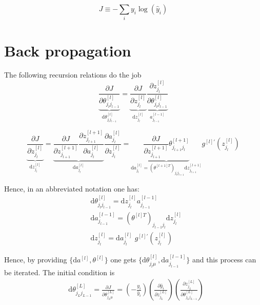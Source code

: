 \documentclass[a4paper,11pt]{article}
\newcommand{\dd}{\text{d}}
\newcommand{\na}[2]{a_{#1}^{[#2]}}
\newcommand{\nz}[2]{z_{#1}^{[#2]}}
\newcommand{\nt}[3]{\theta_{#1 #2}^{[#3]}}
\newcommand{\ff}[2]{#1 \left(#2 \right)}
\begin{document}
\begin{equation}
    J\equiv -\sum_i y_i \ff{\log}{\hat{y}_i }  
\end{equation}

\section{Back propagation}

The following recursion relations do the job
\begin{equation}
    \underbrace{
    \frac{\partial J }{\partial  \nt{j_l}{j_{l-1}}{l}  }
    }_{\dd  \nt{j_l}{j_{l-1}}{l} } 
   =
   \underbrace{
    \frac{\partial J  }{\partial \nz{j_l}{l} }
    }_{\dd  \nz{j_{l}}{l} }
    \underbrace{
    \frac{\partial \nz{j_l}{l} }{\partial \nt{j_l}{j_{l-1}}{l}  }
    }_{ \na{j_{l-1}}{l-1} }
\end{equation}



\begin{equation}
\underbrace{
\frac{\partial J  }{\partial \nz{j_l}{l}   }
}_{\dd  \nz{j_{l}}{l} }
	=
	\underbrace{ 
	\frac{\partial J  }{\partial \nz{j_{l+1}}{l+1}   } 
	\frac{\partial \nz{j_{l+1}}{l+1}   }{ \partial \na{j_{l}}{l}  }
	}_{\dd a_{j_l}^{[l]} }
	\frac{\partial \na{j_{l}}{l}    }{ \partial \nz{j_{l}}{l}  }
	=
	\underbrace{
	\frac{\partial J  }{\partial \nz{j_{l+1}}{l+1}   } 
	 \nt{j_{l+1}}{j_l}{l+1}
	 }_{ \dd a_{j_l}^{[l]}=(\theta^{[l+1]T})_{j_l j_{l+1}} \dd z_{j_{l+1}}^{[l+1]} }
	 g^{[l]'}\left( z_{j_{l}}^{[l]}   \right)
\end{equation}

Hence, in an abbreviated notation one has:
\begin{eqnarray}
	&\dd  \nt{j_l}{j_{l-1}}{l} = \dd  \nz{j_{l}}{l}  \na{j_{l-1}}{l-1}\\
	&\dd a_{j_{l-1}}^{[l-1]}=(\theta^{[l]T})_{j_{l-1} j_{l}} \dd z_{j_{l}}^{[l]}\\
	&\dd  \nz{j_{l}}{l}= \dd a_{j_l}^{[l]} \,\, g^{[l]'}\left( z_{j_{l}}^{[l]}   \right)
\end{eqnarray}

Hence, by providing $\{ \dd a^{[l]}  , \theta^{[l]}\}$ one gets $\{ \dd  \nt{j_l}{\mu}{l}, \dd a_{j_{l-1}}^{[l-1]}\}$ and this process can be iterated. 
The initial condition is
\begin{eqnarray}
    &\dd \theta^{[L]}_{j_L j_{L-1}}= \frac{\partial J }{\partial  \nt{j_L}{\mu}{L}  } =
   \left( -  \frac{y_i }{ \hat{y}_i} \right)
   \left(  \frac{ \partial \hat{y}_i}{\partial z_{j_L}^{[L]} }    \right)
   \left(   \frac{ \partial z_{j_L}^{[L]} } {\partial  \nt{j_L}{j_{L-1}}{L}  }  \right) 
   \label{eq:softmaxp1}
\end{eqnarray}
\end{document}
